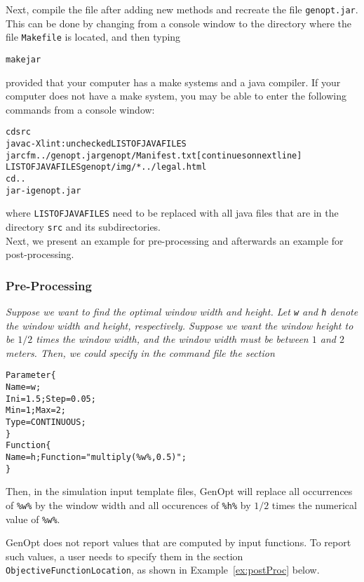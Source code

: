 Next, compile the file after adding new methods and recreate the file
\texttt{genopt.jar}.
This can be done by changing from a console window to the directory
where the file \texttt{Makefile} is located, and then typing
\begin{alltt}
   make jar
\end{alltt}
provided that your computer has a make systems and a java compiler.
If your computer does not have a make system, you may be able to enter the following commands from a console window:
\begin{alltt}
  cd src
  javac -Xlint:unchecked LISTOFJAVAFILES
  jar cfm ../genopt.jar genopt/Manifest.txt [continues on next line]
          LISTOFJAVAFILES genopt/img/* ../legal.html
  cd ..
  jar -i genopt.jar 
\end{alltt}
where \texttt{LISTOFJAVAFILES} need to be replaced with all java files that are in the directory \texttt{src} and its subdirectories.
\\

Next, we present an example for pre-processing and afterwards an example for 
post-processing.

\subsubsection{Pre-Processing}
\begin{example}
{\em
Suppose we want to find the optimal window width and height.
Let {\tt w} and {\tt h} denote the window width and height, respectively.
Suppose we want the window height to be $1/2$ times the window width,
and the window width must be between $1$ and $2$ meters.
Then, we could specify in the command file the section
\begin{alltt}
Parameter\{
   Name =   w;
   Ini  = 1.5;     Step = 0.05;
   Min  =   1;     Max  =    2;
   Type = CONTINUOUS;
\}
Function\{
   Name =   h;     Function = "multiply( \%w\%, 0.5 )";
\}
\end{alltt}
Then, in the simulation input template files, GenOpt will replace all occurrences of
\texttt{\%w\%} by the window width and all occurences of \texttt{\%h\%} 
by $1/2$ times the numerical value of \texttt{\%w\%}.
}
\rbox
\label{ex:preProc}
\end{example}

GenOpt does not report values that are computed by input functions.
To report such values, a user needs to specify them in the section 
\texttt{ObjectiveFunctionLocation}, as shown in Example~\ref{ex:postProc} below.

